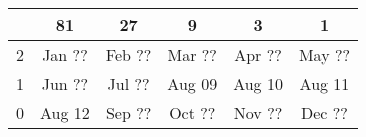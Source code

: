 \begin{center}
\begin{tabular}{c|ccccc}
& 81 & 27 & 9 & 3 & 1 \\\hline
2 & Jan ?? & Feb ?? & Mar ?? & Apr ?? & May ?? \\
1 & Jun ?? & Jul ?? & Aug 09 & Aug 10 & Aug 11 \\
0 & Aug 12 & Sep ?? & Oct ?? & Nov ?? & Dec ??
\end{tabular}
\end{center}
